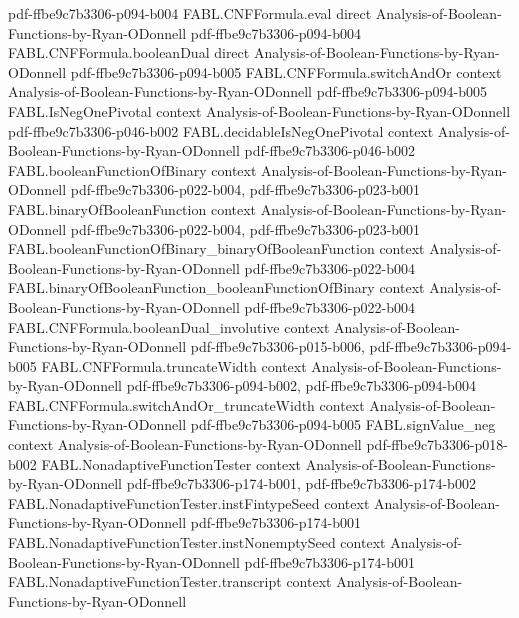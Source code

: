 \begin{theorem}
  {pdf-ffbe9c7b3306-p094-b004}
\proofstep
  {FABL.CNFFormula.eval}
  {direct}
  {Analysis-of-Boolean-Functions-by-Ryan-ODonnell}
  {pdf-ffbe9c7b3306-p094-b004}
\proofstep
  {FABL.CNFFormula.booleanDual}
  {direct}
  {Analysis-of-Boolean-Functions-by-Ryan-ODonnell}
  {pdf-ffbe9c7b3306-p094-b005}
\proofstep
  {FABL.CNFFormula.switchAndOr}
  {context}
  {Analysis-of-Boolean-Functions-by-Ryan-ODonnell}
  {pdf-ffbe9c7b3306-p094-b005}
\proofstep
  {FABL.IsNegOnePivotal}
  {context}
  {Analysis-of-Boolean-Functions-by-Ryan-ODonnell}
  {pdf-ffbe9c7b3306-p046-b002}
\proofstep
  {FABL.decidableIsNegOnePivotal}
  {context}
  {Analysis-of-Boolean-Functions-by-Ryan-ODonnell}
  {pdf-ffbe9c7b3306-p046-b002}
\proofstep
  {FABL.booleanFunctionOfBinary}
  {context}
  {Analysis-of-Boolean-Functions-by-Ryan-ODonnell}
  {pdf-ffbe9c7b3306-p022-b004,
    pdf-ffbe9c7b3306-p023-b001}
\proofstep
  {FABL.binaryOfBooleanFunction}
  {context}
  {Analysis-of-Boolean-Functions-by-Ryan-ODonnell}
  {pdf-ffbe9c7b3306-p022-b004,
    pdf-ffbe9c7b3306-p023-b001}
\proofstep
  {FABL.booleanFunctionOfBinary_binaryOfBooleanFunction}
  {context}
  {Analysis-of-Boolean-Functions-by-Ryan-ODonnell}
  {pdf-ffbe9c7b3306-p022-b004}
\proofstep
  {FABL.binaryOfBooleanFunction_booleanFunctionOfBinary}
  {context}
  {Analysis-of-Boolean-Functions-by-Ryan-ODonnell}
  {pdf-ffbe9c7b3306-p022-b004}
\proofstep
  {FABL.CNFFormula.booleanDual_involutive}
  {context}
  {Analysis-of-Boolean-Functions-by-Ryan-ODonnell}
  {pdf-ffbe9c7b3306-p015-b006,
    pdf-ffbe9c7b3306-p094-b005}
\proofstep
  {FABL.CNFFormula.truncateWidth}
  {context}
  {Analysis-of-Boolean-Functions-by-Ryan-ODonnell}
  {pdf-ffbe9c7b3306-p094-b002,
    pdf-ffbe9c7b3306-p094-b004}
\proofstep
  {FABL.CNFFormula.switchAndOr_truncateWidth}
  {context}
  {Analysis-of-Boolean-Functions-by-Ryan-ODonnell}
  {pdf-ffbe9c7b3306-p094-b005}
\proofstep
  {FABL.signValue_neg}
  {context}
  {Analysis-of-Boolean-Functions-by-Ryan-ODonnell}
  {pdf-ffbe9c7b3306-p018-b002}
\proofstep
  {FABL.NonadaptiveFunctionTester}
  {context}
  {Analysis-of-Boolean-Functions-by-Ryan-ODonnell}
  {pdf-ffbe9c7b3306-p174-b001,
    pdf-ffbe9c7b3306-p174-b002}
\proofstep
  {FABL.NonadaptiveFunctionTester.instFintypeSeed}
  {context}
  {Analysis-of-Boolean-Functions-by-Ryan-ODonnell}
  {pdf-ffbe9c7b3306-p174-b001}
\proofstep
  {FABL.NonadaptiveFunctionTester.instNonemptySeed}
  {context}
  {Analysis-of-Boolean-Functions-by-Ryan-ODonnell}
  {pdf-ffbe9c7b3306-p174-b001}
\proofstep
  {FABL.NonadaptiveFunctionTester.transcript}
  {context}
  {Analysis-of-Boolean-Functions-by-Ryan-ODonnell}

\end{theorem}
